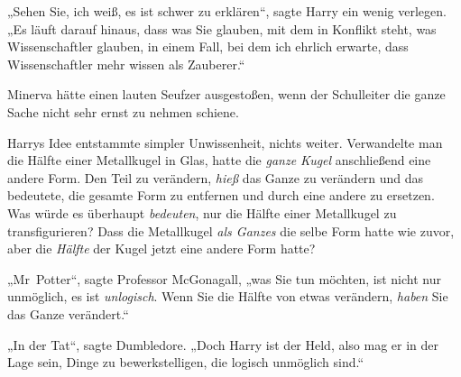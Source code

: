 „Sehen Sie, ich weiß, es ist schwer zu erklären“, sagte Harry ein wenig verlegen. „Es läuft darauf hinaus, dass was Sie glauben, mit dem in Konflikt steht, was Wissenschaftler glauben, in einem Fall, bei dem ich ehrlich erwarte, dass Wissenschaftler mehr wissen als Zauberer.“

Minerva hätte einen lauten Seufzer ausgestoßen, wenn der Schulleiter die ganze Sache nicht sehr ernst zu nehmen schiene.

Harrys Idee entstammte simpler Unwissenheit, nichts weiter. Verwandelte man die Hälfte einer Metallkugel in Glas, hatte die \emph{ganze Kugel} anschließend eine andere Form. Den Teil zu verändern, \emph{hieß} das Ganze zu verändern und das bedeutete, die gesamte Form zu entfernen und durch eine andere zu ersetzen. Was würde es überhaupt \emph{bedeuten}, nur die Hälfte einer Metallkugel zu transfigurieren? Dass die Metallkugel \emph{als Ganzes} die selbe Form hatte wie zuvor, aber die \emph{Hälfte} der Kugel jetzt eine andere Form hatte?

„Mr~Potter“, sagte Professor McGonagall, „was Sie tun möchten, ist nicht nur unmöglich, es ist \emph{unlogisch}. Wenn Sie die Hälfte von etwas verändern, \emph{haben} Sie das Ganze verändert.“

„In der Tat“, sagte Dumbledore. „Doch Harry ist der Held, also mag er in der Lage sein, Dinge zu bewerkstelligen, die logisch unmöglich sind.“

